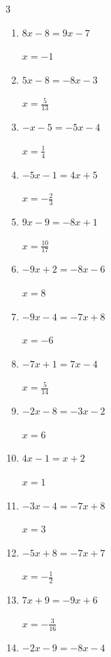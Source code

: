 \begin{multicols}{3}
\begin{enumerate}
        $\displaystyle x=-\frac{2}{5}$

  \item $8x-8=9x-7$

        $\displaystyle x=-1$

  \item $5x-8=-8x-3$

        $\displaystyle x=\frac{5}{13}$

  \item $-x-5=-5x-4$

        $\displaystyle x=\frac{1}{4}$

  \item $-5x-1=4x+5$

        $\displaystyle x=-\frac{2}{3}$

  \item $9x-9=-8x+1$

        $\displaystyle x=\frac{10}{17}$

  \item $-9x+2=-8x-6$

        $\displaystyle x=8$

  \item $-9x-4=-7x+8$

        $\displaystyle x=-6$

  \item $-7x+1=7x-4$

        $\displaystyle x=\frac{5}{14}$

\columnbreak %

\resetques

  \item $-2x-8=-3x-2$

        $\displaystyle x=6$

  \item $4x-1=x+2$

        $\displaystyle x=1$

  \item $-3x-4=-7x+8$

        $\displaystyle x=3$

  \item $-5x+8=-7x+7$

        $\displaystyle x=-\frac{1}{2}$

  \item $7x+9=-9x+6$

        $\displaystyle x=-\frac{3}{16}$

  \item $-2x-9=-8x-4$


\end{enumerate}
\end{multicols}
